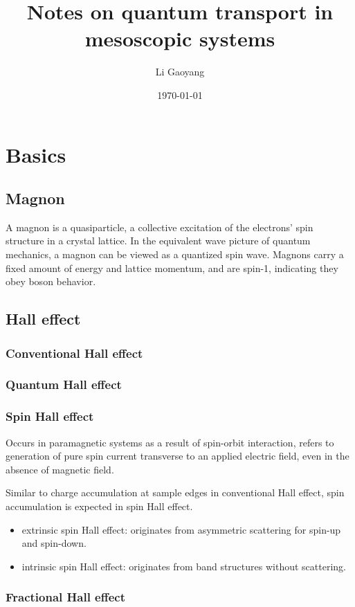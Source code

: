\documentclass[11pt,a4paper]{article}
\begin{document}
\title{Notes on quantum transport in mesoscopic systems}
\author{Li Gaoyang}
\date{\today}
\maketitle
\tableofcontents

\section{Basics}
\subsection{Magnon}
A magnon is a quasiparticle, a collective excitation of the electrons' spin structure in a crystal lattice. In the equivalent wave picture of quantum mechanics, a magnon can be viewed as a quantized spin wave. Magnons carry a fixed amount of energy and lattice momentum, and are spin-1, indicating they obey boson behavior.
\subsection{Hall effect}
\subsubsection{Conventional Hall effect}
\subsubsection{Quantum Hall effect}
\subsubsection{Spin Hall effect}
Occurs in paramagnetic systems as a result of spin-orbit interaction, refers to generation of pure spin current transverse to an applied electric field, even in the absence of magnetic field.

Similar to charge accumulation at sample edges in conventional Hall effect, spin accumulation is expected in spin Hall effect.
\begin{itemize}
\item extrinsic spin Hall effect: originates from asymmetric scattering for spin-up and spin-down.
\item intrinsic spin Hall effect: originates from band structures without scattering.\cite{ref1}
\end{itemize}
\subsubsection{Fractional Hall effect}
\end{document}
